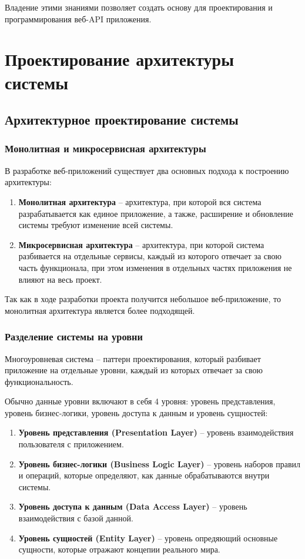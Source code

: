 \documentclass[a4paper,12pt]{report}
\begin{document}
Владение этими знаниями позволяет создать основу для проектирования и программирования веб-\acs{API} приложения.

\chapter{Проектирование архитектуры системы}\label{architecture_chapter_title}

\section{Архитектурное проектирование системы}

\subsection{Монолитная и микросервисная архитектуры}

В разработке веб-приложений существует два основных подхода к построению архитектуры:
\begin{enumerate}
    \item
        \textbf{Монолитная архитектура} -- архитектура, при которой вся система разрабатывается как единое приложение, 
        а также, расширение и обновление системы требуют изменение всей системы.
    \item
        \textbf{Микросервисная архитектура} -- архитектура, при которой система разбивается на отдельные сервисы, 
        каждый из которого отвечает за свою часть функционала, при этом изменения в отдельных частях приложения не влияют на весь проект.
\end{enumerate}

Так как в ходе разработки проекта получится небольшое веб-приложение, то монолитная архитектура является более подходящей.

\subsection{Разделение системы на уровни}

Многоуровневая система -- паттерн проектирования, который разбивает приложение на отдельные уровни, каждый из которых отвечает 
за свою функциональность. 

Обычно данные уровни включают в себя 4 уровня: уровень представления, уровень бизнес-логики, уровень доступа к данным и 
уровень сущностей:
\begin{enumerate}
    \item
        \textbf{Уровень представления (Presentation Layer)} -- уровень взаимодействия пользователя с приложением.
    \item
        \textbf{Уровень бизнес-логики (Business Logic Layer)} -- уровень наборов правил и операций, которые определяют,
        как данные обрабатываются внутри системы.
    \item
        \textbf{Уровень доступа к данным (Data Access Layer)} -- уровень взаимодействия с базой данной.
    \item
        \textbf{Уровень сущностей (Entity Layer)} -- уровень опредяющий основные сущности, которые отражают концепии реального 
        мира.
\end{enumerate}
\end{document}
